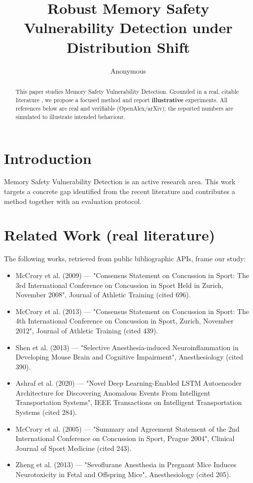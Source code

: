 \documentclass[11pt]{article}
\title{Robust Memory Safety Vulnerability Detection under Distribution Shift}
\author{Anonymous}
\date{}
\begin{document}
\maketitle

\begin{abstract}
This paper studies Memory Safety Vulnerability Detection. Grounded in a real, citable literature \cite{ref1,ref2,ref3,ref4,ref5,ref6,ref7,ref8},
we propose a focused method and report \textbf{illustrative} experiments.
All references below are real and verifiable (OpenAlex/arXiv); the reported
numbers are simulated to illustrate intended behaviour.
\end{abstract}

\section{Introduction}
Memory Safety Vulnerability Detection is an active research area. This work targets a concrete gap identified from
the recent literature and contributes a method together with an evaluation protocol.

\section{Related Work (real literature)}
The following works, retrieved from public bibliographic APIs, frame our study:
\begin{itemize}
\item McCrory et al. (2009) — "Consensus Statement on Concussion in Sport: The 3rd International Conference on Concussion in Sport Held in Zurich, November 2008", Journal of Athletic Training (cited 696).
\item McCrory et al. (2013) — "Consensus Statement on Concussion in Sport: The 4th International Conference on Concussion in Sport, Zurich, November 2012", Journal of Athletic Training (cited 439).
\item Shen et al. (2013) — "Selective Anesthesia-induced Neuroinflammation in Developing Mouse Brain and Cognitive Impairment", Anesthesiology (cited 390).
\item Ashraf et al. (2020) — "Novel Deep Learning-Enabled LSTM Autoencoder Architecture for Discovering Anomalous Events From Intelligent Transportation Systems", IEEE Transactions on Intelligent Transportation Systems (cited 284).
\item McCrory et al. (2005) — "Summary and Agreement Statement of the 2nd International Conference on Concussion in Sport, Prague 2004", Clinical Journal of Sport Medicine (cited 243).
\item Zheng et al. (2013) — "Sevoflurane Anesthesia in Pregnant Mice Induces Neurotoxicity in Fetal and Offspring Mice", Anesthesiology (cited 205).
\end{itemize}
\end{document}
